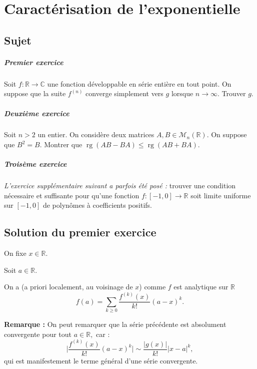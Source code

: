 \chapter{Caractérisation de l'exponentielle}

\section{Sujet}

\paragraph{Premier exercice}
Soit $f : \mathbb{R} \rightarrow  \mathbb{C}$ une fonction développable en série entière en tout point. On suppose que la suite $f^{(n)}$ converge simplement vers $g$ lorsque $n\rightarrow \infty $. Trouver $g$.

\paragraph{Deuxième exercice}
Soit $n > 2$ un entier. On considère deux matrices $A, B \in  \mathscr{M} _{n} (\mathbb{R})$. On suppose que $B^2  = B$. Montrer que $\operatorname{rg}(AB -BA) \leqslant  \operatorname{rg}(AB + BA)$.

\paragraph{Troisème exercice}
\emph{L’exercice supplémentaire suivant a parfois été posé :} trouver une condition nécessaire et suffisante pour qu'une fonction $f : [-1, 0] \rightarrow  \mathbb{R}$ soit limite uniforme sur $[-1, 0]$ de polynômes à coefficients positifs.

\section{Solution du premier exercice}

On fixe $x\in \mathbb{R}.$

Soit $a\in \mathbb{R}.$

On a (a priori localement, au voisinage de $x$) comme $f$ est analytique sur $\mathbb{R}$
$$f(a)=\sum_{k\geq 0}\frac{f^{(k)}(x)}{k!}(a-x)^{k}.$$

\textbf{Remarque :} On peut remarquer que la série précédente est absolument convergente pour tout $a\in \mathbb{R},$ car : $$\vert \frac{f^{(k)}(x)}{k!}(a-x)^{k}\vert \sim \frac{\vert g(x) \vert }{k!}\vert x-a\vert^{k},$$ qui est manifestement le terme général d'une série convergente. 

